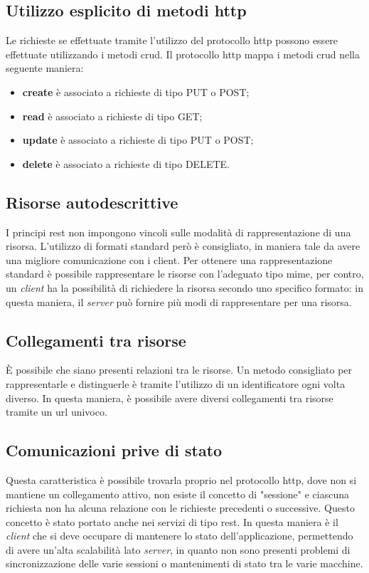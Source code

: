 \subsection{Utilizzo esplicito di metodi \gls{http}}
Le richieste se effettuate tramite l'utilizzo del protocollo \gls{http} possono
essere effettuate utilizzando i metodi \gls{crud}. Il protocollo \gls{http}
mappa i metodi \gls{crud} nella seguente maniera:
\begin{itemize}
  \item \textbf{create} è associato a richieste di tipo PUT o POST;
  \item \textbf{read} è associato a richieste di tipo GET;
  \item \textbf{update} è associato a richieste di tipo PUT o POST;
  \item \textbf{delete} è associato a richieste di tipo DELETE.
\end{itemize}

\subsection{Risorse autodescrittive}
I principi \gls{rest} non impongono vincoli sulle modalità di rappresentazione
di una risorsa. L'utilizzo di formati standard però è consigliato, in maniera
tale da avere una migliore comunicazione con i client. Per ottenere una
rappresentazione standard è possibile rappresentare le risorse con l'adeguato
tipo \gls{mime}, per contro, un \textit{client} ha la possibilità di richiedere
la risorsa secondo uno specifico formato: in questa maniera, il \textit{server}
può fornire più modi di rappresentare per una risorsa.

\subsection{Collegamenti tra risorse}
È possibile che siano presenti relazioni tra le risorse. Un metodo consigliato
per rappresentarle e distinguerle è tramite l'utilizzo di un identificatore
ogni volta diverso.
In questa maniera, è possibile avere diversi collegamenti tra risorse tramite
un \gls{url} univoco.

\subsection{Comunicazioni prive di stato}
Questa caratteristica è possibile trovarla proprio nel protocollo \gls{http},
dove non si mantiene un collegamento attivo, non esiste il concetto di
"sessione" e ciascuna richiesta non ha alcuna relazione con le richieste
precedenti o successive. Questo concetto è stato portato anche nei servizi di
tipo \gls{rest}.
In questa maniera è il \textit{client} che si deve occupare di mantenere lo
stato dell'applicazione, permettendo di avere un'alta scalabilità lato
\textit{server}, in quanto non sono presenti problemi di sincronizzazione delle
varie sessioni o mantenimenti di stato tra le varie macchine.
